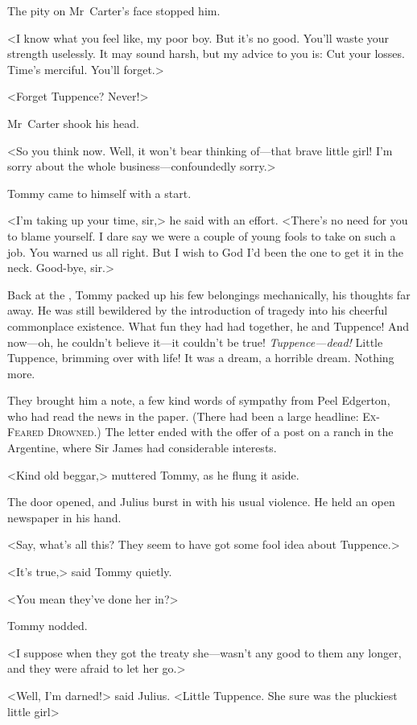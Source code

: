 The pity on Mr~Carter's face stopped him.

<I know what you feel like, my poor boy. But it's no good. You'll waste your strength uselessly. It may sound harsh, but my advice to you is: Cut your losses. Time's merciful. You'll forget.>

<Forget Tuppence? Never!>

Mr~Carter shook his head.

<So you think now. Well, it won't bear thinking of—that brave little girl! I'm sorry about the whole business—confoundedly sorry.>

Tommy came to himself with a start.

<I'm taking up your time, sir,> he said with an effort. <There's no need for you to blame yourself. I dare say we were a couple of young fools to take on such a job. You warned us all right. But I wish to God I'd been the one to get it in the neck. Good-bye, sir.>

Back at the , Tommy packed up his few belongings mechanically, his thoughts far away. He was still bewildered by the introduction of tragedy into his cheerful commonplace existence. What fun they had had together, he and Tuppence! And now—oh, he couldn't believe it—it couldn't be true! \emph{Tuppence—dead!} Little Tuppence, brimming over with life! It was a dream, a horrible dream. Nothing more.

They brought him a note, a few kind words of sympathy from Peel Edgerton, who had read the news in the paper. (There had been a large headline: \textsc{Ex- Feared Drowned.}) The letter ended with the offer of a post on a ranch in the Argentine, where Sir James had considerable interests.

<Kind old beggar,> muttered Tommy, as he flung it aside.

The door opened, and Julius burst in with his usual violence. He held an open newspaper in his hand.

<Say, what's all this? They seem to have got some fool idea about Tuppence.>

<It's true,> said Tommy quietly.

<You mean they've done her in?>

Tommy nodded.

<I suppose when they got the treaty she—wasn't any good to them any longer, and they were afraid to let her go.>

<Well, I'm darned!> said Julius. <Little Tuppence. She sure was the pluckiest little girl\longdash>

